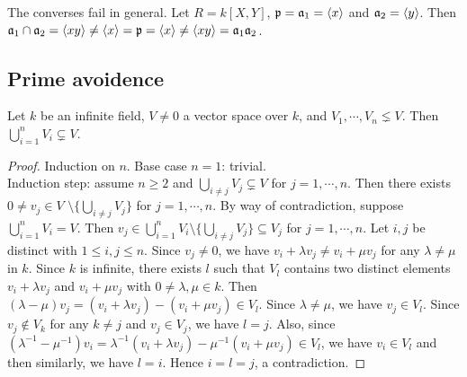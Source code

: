 \begin{example*}
    The converses fail in general. Let $R = k[X,Y]$, $\mathfrak{p} = \mathfrak{a}_1 = \langle x \rangle$ and $\mathfrak{a}_2 = \langle y \rangle$. Then $\mathfrak{a}_1 \cap \mathfrak{a}_2 = \langle xy \rangle \neq \langle x \rangle = \mathfrak{p} = \langle x \rangle \neq  \langle xy \rangle = \mathfrak{a}_1\mathfrak{a}_2$.
\end{example*}

\subsection*{Prime avoidence}

\begin{lemma}
    Let $k$ be an infinite field, $V \neq 0$ a vector space over $k$, and $V_1,\cdots,V_n \lneq V$. Then $\bigcup_{i=1}^n V_i \subsetneq V$.
\end{lemma}

\begin{proof}
    Induction on $n$. Base case $n = 1$: trivial. \\
    Induction step: assume $n \geq 2$ and $\bigcup_{i \neq j}V_j \subsetneq V$ for $j = 1,\cdots,n$. Then there exists $0 \neq v_j \in V$ $\setminus \{\bigcup_{i \neq j}V_j\}$ for $j = 1,\cdots,n$. By way of contradiction, suppose $\bigcup_{i=1}^nV_i = V$. Then $v_j \in \bigcup_{i=1}^n V_i \setminus \{\bigcup_{i \neq j}V_j\} \subseteq V_j$ for $j = 1,\cdots,n$. Let $i,j$ be distinct with $1 \leq i,j \leq n$. Since $v_j \neq 0$, we have $v_i + \lambda v_j \neq v_i + \mu v_j$ for any $\lambda \neq \mu$ in $k$. Since $k$ is infinite, there exists $l$ such that $V_l$ contains two distinct elements $v_i + \lambda v_j$ and $v_i + \mu v_j$ with $0 \neq \lambda, \mu \in k$. Then $(\lambda-\mu)v_j = (v_i + \lambda v_j) - (v_i + \mu v_j) \in V_l$. Since $\lambda \neq \mu$, we have $v_j \in V_l$. Since $v_j \not \in V_k$ for any $k \neq j$ and $v_j \in V_j$, we have $l = j$. Also, since $(\lambda^{-1}-\mu^{-1})v_i = \lambda^{-1}(v_i + \lambda v_j) - \mu^{-1}(v_i + \mu v_j) \in V_l$, we have $v_i \in V_l$ and then similarly, we have $l=i$. Hence $i = l = j$, a contradiction.
\end{proof}

